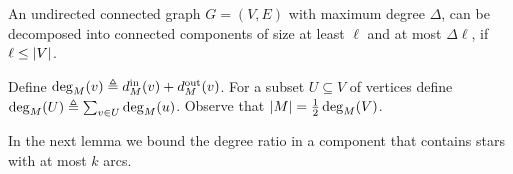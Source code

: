 \begin{lemma}
\label{lemma:dec}
An undirected connected graph $G = (V,E)$ with maximum degree
$\Delta$, can be decomposed into connected components of size at least
$\ell$ and at most $\Delta \ell$, if $\ell \leq \abs{V}$.
\end{lemma}

\iffalse %

\begin{proof}
Let $T$ be any spanning tree of $G$ and let $r$ be an arbitrary root.
Starting with $r$, repeatedly choose a child whose subtree is strictly
larger than $\frac{\Delta-1}{\Delta} \abs{V}$, until this is not
possible.  Hence, we have reached a vertex $v$ whose subtree contains
more than $\frac{\Delta-1}{\Delta} \abs{V}$ vertices, but the subtrees
of its children contain at most $\frac{\Delta-1}{\Delta} \abs{V}$
vertices.
%
If $v = r$, then $v$ has a child $u$ with at least $\inv{\Delta}
(\abs{V}-1) \geq \ell$ vertices.  Otherwise, there exists a child $u$
of $v$ whose subtree is of size at least
$\inv{\Delta} \abs{V} \geq \ell$.  Disconnect $u$ and the vertices in
its subtree from the graph.
%
In both cases $u$'s subtree contains at most
$\frac{\Delta-1}{\Delta} \abs{V}$ vertices, and thus at least
$\inv{\Delta} \abs{V} \geq \ell$ vertices remain in the graph.  Hence
we obtain two connected subgraphs of size at least $\ell$.
%
We repeat this procedure recursively on any component of size
strictly larger $\Delta\ell$.
\end{proof}

\fi %

Define $\deg_M(v) \eqdf \din[M](v) + \dout[M](v)$.  For a subset
$U \subseteq V$ of vertices define $\deg_M(U) \eqdf \sum_{v \in
U} \deg_M(u)$.
%
Observe that $\abs{M} = \half \deg_M(V)$.

In the next lemma we bound the degree ratio in a component that
contains stars with at most $k$ arcs.

